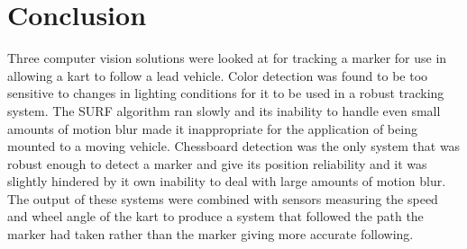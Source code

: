 \section{Conclusion}

Three computer vision solutions were looked at for tracking a marker for use in allowing a kart to follow a lead vehicle. Color detection was found to be too sensitive to changes in lighting conditions for it to be used in a robust tracking system. The SURF algorithm ran slowly and its inability to handle even small amounts of motion blur made it inappropriate for the application of being mounted to a moving vehicle. Chessboard detection was the only system that was robust enough to detect a marker and give its position reliability and it was slightly hindered by it own inability to deal with large amounts of motion blur. The output of these systems were combined with sensors measuring the speed and wheel angle of the kart to produce a system that followed the path the marker had taken rather than the marker giving more accurate following. 